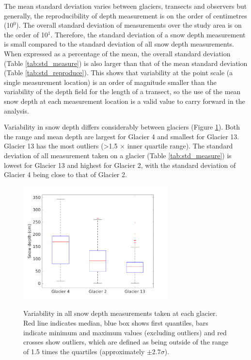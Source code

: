 \documentclass{sfuthesis}
\begin{document}
\begin{appendices}
The mean standard deviation varies between glaciers, transects and observers but  generally, the reproducibility of depth measurement is on the order of centimetres (10$^0$). The overall standard deviation of measurements over the study area is on the order of 10$^1$. Therefore, the standard deviation of a snow depth measurement is small compared to the standard deviation of all snow depth measurements. When expressed as a percentage of the mean, the overall standard deviation (Table \ref{tab:std_measure}) is also larger than that of the mean standard deviation (Table \ref{tab:std_reproduce}). This shows that variability at the point scale (a single measurement location) is an order of magnitude smaller than the variability of the depth field for the length of a transect, so the use of the mean snow depth at each measurement location is a valid value to carry forward in the analysis. 

Variability in snow depth differs considerably between glaciers (Figure \ref{fig:box_depth}). Both the range and mean depth are largest for Glacier 4 and smallest for Glacier 13. Glacier 13 has the most outliers (\textgreater 1.5 $\times$ inner quartile range). The standard deviation of all measurement taken on a glacier (Table \ref{tab:std_measure}) is lowest for Glacier 13 and highest for Glacier 2, with the standard deviation of Glacier 4 being close to that of Glacier 2. 


\begin{figure} 
\centering
	\includegraphics[width = 0.7\textwidth]{box_depth.png}\\
	\caption[]{Variability in all snow depth measurements taken at each glacier. Red line indicates median, blue box shows first quantiles, bars indicate minimum and maximum values (excluding outliers) and red crosses show outliers, which are defined as being outside of the range of 1.5 times the quartiles (approximately $\pm2.7\sigma$).}
	\label{fig:box_depth}
\end{figure}


\end{appendices}
\end{document}
